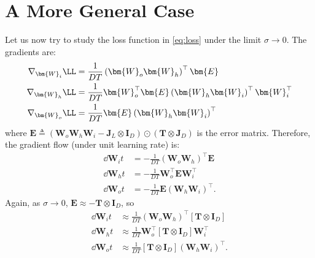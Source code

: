 \documentclass{article}
\begin{document}
\section{A More General Case}
Let us now try to study the loss function in \cref{eq:loss} under the limit $\sigma \to 0$.
The gradients are:
\begin{align*}
    \nabla_{\bm{W}_i} \LL &= \frac{1}{DT} \left( \bm{W}_{o} \bm{W}_{h} \right)^\top \bm{E} \\
    \nabla_{\bm{W}_h} \LL &= \frac{1}{DT} \bm{W}_{o}^\top \bm{E} \left( \bm{W}_{h} \bm{W}_{i} \right)^\top \bm{W}_{i}^\top \\
    \nabla_{\bm{W}_o} \LL &= \frac{1}{DT} \bm{E} \left( \bm{W}_{h} \bm{W}_{i} \right)^\top
\end{align*}
where $\bm{E} \triangleq \left( \bm{W}_o \bm{W}_h \bm{W}_i - \bm{J}_L \otimes \bm{I}_D \right) \odot ( \bm{T} \otimes \bm{J}_D )$ is the error matrix.
Therefore, the gradient flow (under unit learning rate) is:
\begin{align*}
    \dd{\bm{W}_i}{t} &= -\frac{1}{DT} \left( \bm{W}_{o} \bm{W}_{h} \right)^\top \bm{E} \\
    \dd{\bm{W}_h}{t} &= -\frac{1}{DT} \bm{W}_{o}^\top \bm{E} \bm{W}_{i}^\top \\
    \dd{\bm{W}_o}{t} &= -\frac{1}{DT} \bm{E} \left( \bm{W}_{h} \bm{W}_{i} \right)^\top.
\end{align*}
Again, as $\sigma \to 0$, $\bm{E} \approx - \bm{T} \otimes \bm{I}_D$, so
\begin{align*}
    \dd{\bm{W}_i}{t} &\approx \frac{1}{DT} \left( \bm{W}_{o} \bm{W}_{h} \right)^\top \left[ \bm{T} \otimes \bm{I}_D \right] \\
    \dd{\bm{W}_h}{t} &\approx \frac{1}{DT} \bm{W}_{o}^\top \left[ \bm{T} \otimes \bm{I}_D \right] \bm{W}_{i}^\top \\
    \dd{\bm{W}_o}{t} &\approx \frac{1}{DT} \left[ \bm{T} \otimes \bm{I}_D \right] \left( \bm{W}_{h} \bm{W}_{i} \right)^\top.
\end{align*}
\end{document}
